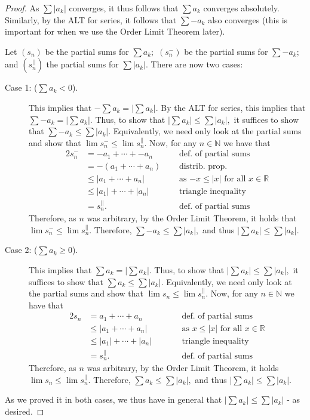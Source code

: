 \documentclass[10pt]{article}
\begin{document}
\begin{proof}
    As $\sum |a_k|$ converges, it thus follows that $\sum a_k$ converges absolutely. Similarly, by the ALT for series, it follows that $\sum -a_k$ also converges (this is important for when we use the Order Limit Theorem later). 
    
    Let $(s_n)$ be the partial sums for $\sum a_k;$ $(s^-_n)$  be the partial sums for $\sum -a_k;$ and $(s^{||}_n)$ the partial sums for $\sum |a_k|$. There are now two cases:
    \begin{description}
        \item[Case 1: ($\sum a_k < 0$).] This implies that $-\sum a_k = |\sum a_k|.$ By the ALT for series, this implies that  $\sum -a_k = |\sum a_k|.$  Thus, to show that $|\sum a_k|\le \sum |a_k|,$ it suffices to show that $\sum -a_k\le \sum |a_k|.$ Equivalently, we need only look at the partial sums and show that
        $\lim s^-_n \le\lim s^{||}_n.$ Now, for any $n\in\mathbb{N}$ we have that
       \begin{alignat*}{2}
           s^-_n &= -a_1 +  \cdots + -a_n &&\text{def. of partial sums}\\
           &= - (a_1 + \cdots + a_n) &&\text{distrib. prop.}\\
           &\le |a_1 + \cdots + a_n|&&\text{as $-x\le|x|$ for all $x\in\mathbb{R}$}\\
           &\le |a_1| + \cdots + |a_n|\qquad&&\text{triangle inequality}\\
           &= s^{||}_n.&&\text{def. of partial sums}
       \end{alignat*}
       Therefore, as $n$ was arbitrary, by the Order Limit Theorem, it holds that $\lim s^-_n \le\lim s^{||}_n.$ Therefore,  $\sum -a_k\le \sum |a_k|,$ and thus  $|\sum a_k|\le \sum |a_k|.$
        \item[Case 2: ($\sum a_k \ge 0$).] This implies that $\sum a_k = |\sum a_k|.$ Thus, to show that $|\sum a_k|\le \sum |a_k|,$ it suffices to show that $\sum a_k\le \sum |a_k|.$  Equivalently, we need only look at the partial sums and show that $\lim s_n \le\lim s^{||}_n.$ Now, for any $n\in\mathbb{N}$ we have that
        \begin{alignat*}{2}
            s_n &= a_1 + \cdots + a_n &&\text{def. of partial sums}\\
            &\le |a_1 + \cdots + a_n| &&\text{as $x\le|x|$ for all $x\in\mathbb{R}$}\\
            &\le |a_1| + \cdots + |a_n|\qquad&&\text{triangle inequality}\\
            &= s^{||}_n. &&\text{def. of partial sums}
        \end{alignat*}
        Therefore, as $n$ was arbitrary, by the Order Limit Theorem, it holds $\lim s_n \le\lim s^{||}_n.$ Therefore,  $\sum a_k\le \sum |a_k|,$ and thus  $|\sum a_k|\le \sum |a_k|.$
    \end{description}
    As we proved it in both cases, we thus have in general that $|\sum a_k|\le \sum |a_k|$ - as desired.
\end{proof}
\end{document}

